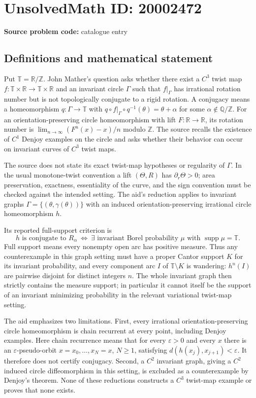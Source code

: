 \documentclass[11pt]{article}
\newcommand{\Z}{\mathbb{Z}}
\newcommand{\Q}{\mathbb{Q}}
\newcommand{\R}{\mathbb{R}}
\newcommand{\eps}{\varepsilon}
\begin{document}
\section*{UnsolvedMath ID: 20002472}
\textbf{Source problem code:} catalogue entry
\subsection{Definitions and mathematical statement}
Put $\mathbb T=\R/\Z$. John Mather's question asks whether there exist a $C^3$ twist map $f:\mathbb T\times\R\to\mathbb T\times\R$ and an invariant circle $\Gamma$ such that $f|_\Gamma$ has irrational rotation number but is not topologically conjugate to a rigid rotation. A conjugacy means a homeomorphism $q:\Gamma\to\mathbb T$ with $q\circ f|_\Gamma\circ q^{-1}(\theta)=\theta+\alpha$ for some $\alpha\notin\Q/\Z$. For an orientation-preserving circle homeomorphism with lift $F:\R\to\R$, its rotation number is $\lim_{n\to\infty}(F^n(x)-x)/n$ modulo $\Z$. The source recalls the existence of $C^1$ Denjoy examples on the circle and asks whether their behavior can occur on invariant curves of $C^3$ twist maps.

The source does not state its exact twist-map hypotheses or regularity of $\Gamma$. In the usual monotone-twist convention a lift $(\Theta,R)$ has $\partial_r\Theta>0$; area preservation, exactness, essentiality of the curve, and the sign convention must be checked against the intended setting. The aid's reduction applies to invariant graphs $\Gamma=\{(\theta,\gamma(\theta))\}$ with an induced orientation-preserving irrational circle homeomorphism $h$.

Its reported full-support criterion is
\[
 h\text{ is conjugate to }R_\alpha
 \ \Longleftrightarrow\ \exists\text{ invariant Borel probability }\mu
 \text{ with }\operatorname{supp}\mu=\mathbb T.
\]
Full support means every nonempty open arc has positive measure. Thus any counterexample in this graph setting must have a proper Cantor support $K$ for its invariant probability, and every component arc $I$ of $\mathbb T\setminus K$ is wandering: $h^n(I)$ are pairwise disjoint for distinct integers $n$. The whole invariant graph then strictly contains the measure support; in particular it cannot itself be the support of an invariant minimizing probability in the relevant variational twist-map setting.

The aid emphasizes two limitations. First, every irrational orientation-preserving circle homeomorphism is chain recurrent at every point, including Denjoy examples. Here chain recurrence means that for every $\eps>0$ and every $x$ there is an $\eps$-pseudo-orbit $x=x_0,\ldots,x_N=x$, $N\ge1$, satisfying $d(h(x_j),x_{j+1})<\eps$. It therefore does not certify conjugacy. Second, a $C^2$ invariant graph, giving a $C^2$ induced circle diffeomorphism in this setting, is excluded as a counterexample by Denjoy's theorem. None of these reductions constructs a $C^3$ twist-map example or proves that none exists.
\end{document}
